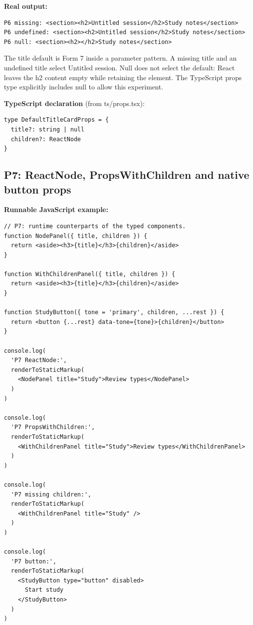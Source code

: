\documentclass[10pt,a4paper]{article}
\begin{document}

\textbf{Real output:}

\begin{lstlisting}[language={}]
P6 missing: <section><h2>Untitled session</h2>Study notes</section>
P6 undefined: <section><h2>Untitled session</h2>Study notes</section>
P6 null: <section><h2></h2>Study notes</section>
\end{lstlisting}

The title default is Form 7 inside a parameter pattern. A missing title and an undefined title select Untitled session. Null does not select the default: React leaves the h2 content empty while retaining the element. The TypeScript props type explicitly includes null to allow this experiment.


\textbf{TypeScript declaration} (from ts/props.tsx):

\begin{lstlisting}[language=GuideJS]
type DefaultTitleCardProps = {
  title?: string | null
  children?: ReactNode
}
\end{lstlisting}

\subsection{P7: ReactNode, PropsWithChildren and native button props}

\textbf{Runnable JavaScript example:}

\begin{lstlisting}[language=GuideJS]
// P7: runtime counterparts of the typed components.
function NodePanel({ title, children }) {
  return <aside><h3>{title}</h3>{children}</aside>
}

function WithChildrenPanel({ title, children }) {
  return <aside><h3>{title}</h3>{children}</aside>
}

function StudyButton({ tone = 'primary', children, ...rest }) {
  return <button {...rest} data-tone={tone}>{children}</button>
}

console.log(
  'P7 ReactNode:',
  renderToStaticMarkup(
    <NodePanel title="Study">Review types</NodePanel>
  )
)

console.log(
  'P7 PropsWithChildren:',
  renderToStaticMarkup(
    <WithChildrenPanel title="Study">Review types</WithChildrenPanel>
  )
)

console.log(
  'P7 missing children:',
  renderToStaticMarkup(
    <WithChildrenPanel title="Study" />
  )
)

console.log(
  'P7 button:',
  renderToStaticMarkup(
    <StudyButton type="button" disabled>
      Start study
    </StudyButton>
  )
)
\end{lstlisting}
\end{document}
